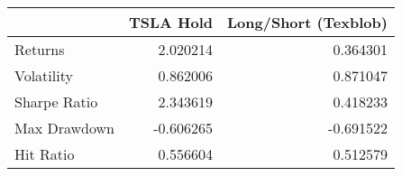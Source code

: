 \begin{tabular}{lrr}
\toprule
{} &  TSLA Hold &  Long/Short (Texblob) \\
\midrule
Returns      &   2.020214 &              0.364301 \\
Volatility   &   0.862006 &              0.871047 \\
Sharpe Ratio &   2.343619 &              0.418233 \\
Max Drawdown &  -0.606265 &             -0.691522 \\
Hit Ratio    &   0.556604 &              0.512579 \\
\bottomrule
\end{tabular}
